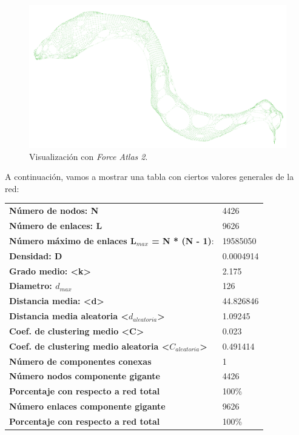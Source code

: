 \documentclass[11pt]{article}
\begin{document}
\begin{figure}[H]
	\centering
	\includegraphics[width=\linewidth]{images/2_1_fa.png}
	\caption{Visualización con \textit{Force Atlas 2}.}
\end{figure}

A continuación, vamos a mostrar una tabla con ciertos valores generales de la red:

\begin{table}[H]
	\centering
	\begin{tabular}{ll}
		\textbf{Número de nodos: N} & 4426 \\
		\textbf{Número de enlaces: L} & 9626 \\
		\textbf{Número máximo de enlaces L$_{max}$ = N * (N - 1)}:  & 19585050 \\
		\textbf{Densidad: D} & 0.0004914 \\
		\textbf{Grado medio: \textless k\textgreater} & 2.175 \\
		\textbf{Diametro: $d_{max}$} & 126 \\
		\textbf{Distancia media: \textless d\textgreater} & 44.826846 \\
		\textbf{Distancia media aleatoria \textless $d_{aleatoria}$\textgreater} & 1.09245 \\
		\textbf{Coef. de clustering medio \textless C\textgreater} & 0.023 \\
		\textbf{Coef. de clustering medio aleatoria \textless $C_{aleatoria}$\textgreater} & 0.491414\\
		\textbf{Número de componentes conexas} &  1\\
		\textbf{Número nodos componente gigante} &  4426\\
		\textbf{Porcentaje con respecto a red total} &  100\%\\
		\textbf{Número enlaces componente gigante} & 9626\\
		\textbf{Porcentaje con respecto a red total} &  100\%
	\end{tabular}
\end{table}
\end{document}
